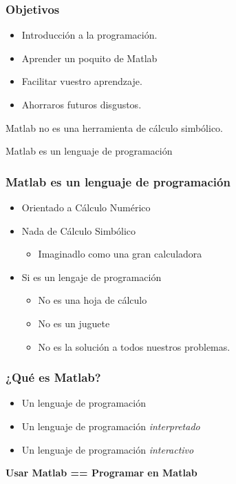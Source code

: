 \documentclass[12pt]{beamer}
\begin{document}
\begin{frame}
  \frametitle{Objetivos}
  \begin{itemize}
  \item Introducción a la programación.
  \item Aprender un poquito de Matlab
  \item Facilitar vuestro aprendzaje.
  \item Ahorraros futuros disgustos.
  \end{itemize}
\end{frame}

\begin{frame}
  \begin{Huge}
    \begin{center}
      Matlab no es una herramienta de cálculo simbólico.
    \end{center}
  \end{Huge}
  \pause
  Matlab es un lenguaje de programación
\end{frame}

\begin{frame}
  \frametitle{Matlab es un lenguaje de programación}
  \begin{itemize}
  \item Orientado a Cálculo Numérico
  \item Nada de Cálculo Simbólico
    \begin{itemize}
    \item Imaginadlo como una gran calculadora
    \end{itemize}
  \item Si es un lengaje de programación
    \begin{itemize}
    \item No es una hoja de cálculo
    \item No es un juguete
    \item No es la solución a todos nuestros problemas.
    \end{itemize}
  \end{itemize}
\end{frame}

\begin{frame}
  \frametitle{¿Qué es Matlab?}
  \begin{itemize}
    \item{Un lenguaje de programación}
    \item{Un lenguaje de programación \emph{interpretado}}
    \item{Un lenguaje de programación \emph{interactivo}}
  \end{itemize}
  \begin{center}
    \textbf{Usar Matlab == Programar en Matlab}
  \end{center}
\end{frame}
\end{document}
